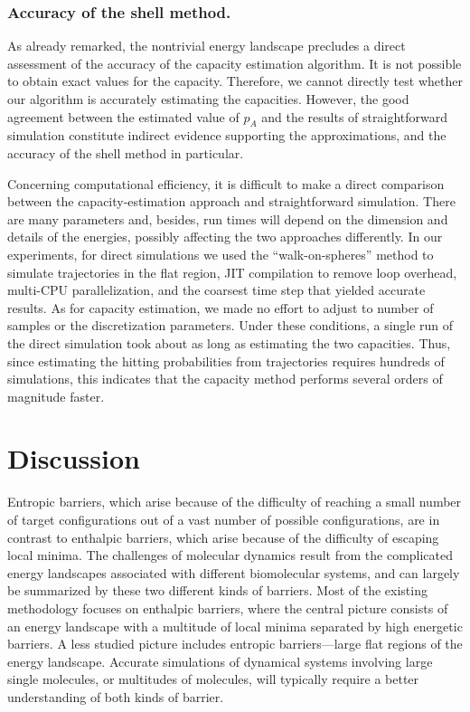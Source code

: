 \documentclass[nofootinbib,english, aip, jcp, priprint, graphicx,floatfix]{revtex4-1}
\theoremstyle{plain}
\theoremstyle{definition}
\theoremstyle{plain}
\begin{document}
\subsubsection{Accuracy of the shell method.}

As already remarked, the nontrivial energy landscape precludes a direct assessment of the accuracy of the capacity estimation algorithm.  It is not possible to obtain exact values for the capacity.  Therefore, we cannot directly test whether our algorithm is accurately estimating the capacities.  However, the good agreement between the estimated value of $p_A$ and the results of straightforward simulation constitute indirect evidence supporting the approximations, and the accuracy of the shell method in particular.

Concerning computational efficiency, it is difficult to make a direct comparison between the capacity-estimation approach and straightforward simulation. There are many parameters and, besides, run times will depend on the dimension and details of the energies, possibly affecting the two approaches differently.
In our experiments, for direct simulations we used the 
``walk-on-spheres'' method to simulate trajectories in the flat region,\cite{bingham1972random} JIT compilation to remove loop overhead, multi-CPU parallelization, and the coarsest time step that yielded accurate results. As for capacity estimation, we made no effort to adjust to number of samples or the discretization parameters. Under these conditions, a single run of the direct simulation took about as long as estimating the two capacities.  Thus, since  estimating the hitting probabilities from trajectories requires hundreds of simulations, this indicates that the capacity method performs several orders of magnitude faster.  

\section{Discussion} 
\label{sec:Discussion}


Entropic barriers, which arise because of the difficulty of reaching a small number of target configurations out of a vast number of possible configurations, are in contrast to enthalpic barriers, which arise because of the difficulty of escaping local minima. The challenges of molecular dynamics result from the complicated energy landscapes associated with different biomolecular systems, and can largely be summarized by these two different kinds of barriers. Most of the existing methodology focuses on enthalpic barriers, where the central picture consists of an energy landscape with a multitude of local minima separated by high energetic barriers. A less studied picture includes entropic barriers---large 
flat regions of the energy landscape. Accurate simulations of  dynamical systems involving large single molecules, or multitudes of molecules, will typically require a better understanding of both kinds of barrier.
\end{document}
